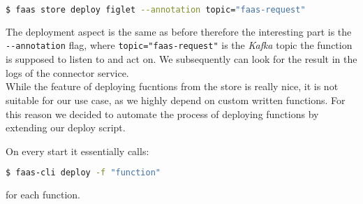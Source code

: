 \begin{lstlisting}[language=bash]
  $ faas store deploy figlet --annotation topic="faas-request"
\end{lstlisting}

The deployment aspect is the same as before therefore the interesting part is the
\texttt{-{}-annotation} flag, where \texttt{topic="faas-request"} is the \textit{Kafka} topic the
function is supposed to listen to and act on. We subsequently can look for the result in the logs of
the connector service. \\
While the feature of deploying fucntions from the store is really nice, it is not suitable for our
use case, as we highly depend on custom written functions. For this reason we decided to automate
the process of deploying functions by extending our deploy script.

On every start it essentially calls:

\begin{lstlisting}[language=bash]
  $ faas-cli deploy -f "function"
\end{lstlisting}

for each function.
